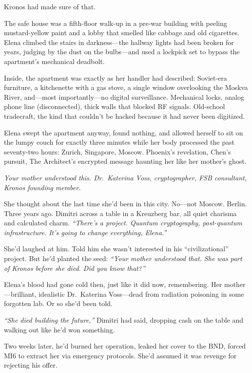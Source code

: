 Kronos had made sure of that.

The safe house was a fifth-floor walk-up in a pre-war building with peeling mustard-yellow paint and a lobby that smelled like cabbage and old cigarettes. Elena climbed the stairs in darkness---the hallway lights had been broken for years, judging by the dust on the bulbs---and used a lockpick set to bypass the apartment's mechanical deadbolt.

Inside, the apartment was exactly as her handler had described: Soviet-era furniture, a kitchenette with a gas stove, a single window overlooking the Moskva River, and---most importantly---no digital surveillance. Mechanical locks, analog phone line (disconnected), thick walls that blocked RF signals. Old-school tradecraft, the kind that couldn't be hacked because it had never been digitized.

Elena swept the apartment anyway, found nothing, and allowed herself to sit on the lumpy couch for exactly three minutes while her body processed the past seventy-two hours: Zurich, Singapore, Moscow. Phoenix's revelation, Chen's pursuit, The Architect's encrypted message haunting her like her mother's ghost.

\emph{Your mother understood this. Dr.~Katerina Voss, cryptographer, FSB consultant, Kronos founding member.}

She thought about the last time she'd been in this city. No---not Moscow. Berlin. Three years ago. Dimitri across a table in a Kreuzberg bar, all quiet charisma and calculated charm. \emph{``There's a project. Quantum cryptography, post-quantum infrastructure. It's going to change everything, Elena.''}

She'd laughed at him. Told him she wasn't interested in his ``civilizational'' project. But he'd planted the seed: \emph{``Your mother understood that. She was part of Kronos before she died. Did you know that?''}

Elena's blood had gone cold then, just like it did now, remembering. Her mother---brilliant, idealistic Dr.~Katerina Voss---dead from radiation poisoning in some forgotten lab. Or so she'd been told.

\emph{``She died building the future,''} Dimitri had said, dropping cash on the table and walking out like he'd won something.

Two weeks later, he'd burned her operation, leaked her cover to the BND, forced MI6 to extract her via emergency protocols. She'd assumed it was revenge for rejecting his offer.

